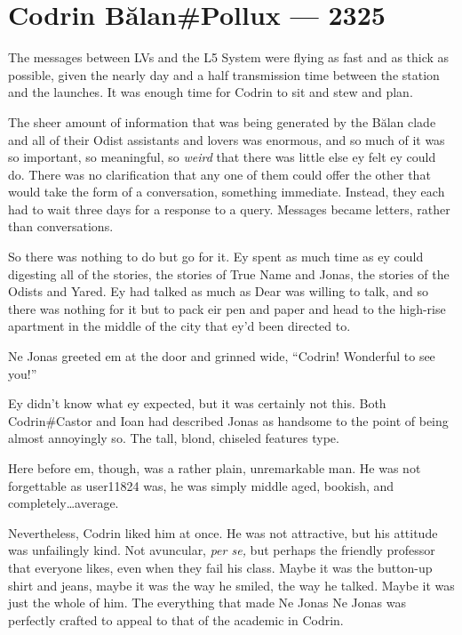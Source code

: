 \hypertarget{codrin-bux103lanpollux-2325}{%
\chapter{Codrin Bălan\#Pollux — 2325}\label{codrin-bux103lanpollux-2325}}

The messages between LVs and the L5 System were flying as fast and as thick as possible, given the nearly day and a half transmission time between the station and the launches. It was enough time for Codrin to sit and stew and plan.

The sheer amount of information that was being generated by the Bălan clade and all of their Odist assistants and lovers was enormous, and so much of it was so important, so meaningful, so \emph{weird} that there was little else ey felt ey could do. There was no clarification that any one of them could offer the other that would take the form of a conversation, something immediate. Instead, they each had to wait three days for a response to a query. Messages became letters, rather than conversations.

So there was nothing to do but go for it. Ey spent as much time as ey could digesting all of the stories, the stories of True Name and Jonas, the stories of the Odists and Yared. Ey had talked as much as Dear was willing to talk, and so there was nothing for it but to pack eir pen and paper and head to the high-rise apartment in the middle of the city that ey'd been directed to.

Ne Jonas greeted em at the door and grinned wide, ``Codrin! Wonderful to see you!''

Ey didn't know what ey expected, but it was certainly not this. Both Codrin\#Castor and Ioan had described Jonas as handsome to the point of being almost annoyingly so. The tall, blond, chiseled features type.

Here before em, though, was a rather plain, unremarkable man. He was not forgettable as user11824 was, he was simply middle aged, bookish, and completely\ldots average.

Nevertheless, Codrin liked him at once. He was not attractive, but his attitude was unfailingly kind. Not avuncular, \emph{per se,} but perhaps the friendly professor that everyone likes, even when they fail his class. Maybe it was the button-up shirt and jeans, maybe it was the way he smiled, the way he talked. Maybe it was just the whole of him. The everything that made Ne Jonas Ne Jonas was perfectly crafted to appeal to that of the academic in Codrin.

